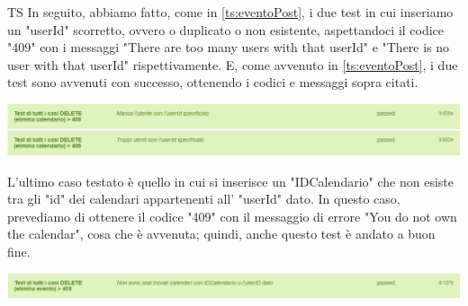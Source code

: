 \begin{listaPersonale}{TS}
                In seguito, abbiamo fatto, come in \ref{ts:eventoPost}, i due test in cui inseriamo un "userId" scorretto, ovvero o duplicato o non esistente, aspettandoci il codice "409" con i messaggi "There are too many users with that userId" e "There is no user with that userId" rispettivamente. E, come avvenuto in \ref{ts:eventoPost}, i due test sono avvenuti con successo, ottenendo i codici e messaggi sopra citati.
                \begin{center}
                        \includegraphics[width=1\textwidth, height=0.08\textheight]{img/png/tests/CalendarioDelete/409_userId_deleteCalendario.png}
                \end{center}
                L'ultimo caso testato è quello in cui si inserisce un "IDCalendario" che non esiste tra gli "id" dei calendari appartenenti all' "userId" dato. In questo caso, prevediamo di ottenere il codice "409" con il messaggio di errore "You do not own the calendar", cosa che è avvenuta; quindi, anche questo test è andato a buon fine.
                \begin{center}
                        \includegraphics[width=1\textwidth, height=0.04\textheight]{img/png/tests/EventoDelete/409_DeleteEvento.png}
                \end{center}


\end{listaPersonale}
